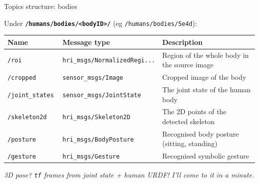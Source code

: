 \documentclass[xcolor=table]{beamer}
\begin{document}
\begin{frame}{Topics structure: bodies}

    Under \textbf{\texttt{/humans/bodies/<bodyID>/}} (eg \texttt{/humans/bodies/5e4d}):

    \scriptsize
    \begin{tabular}{@{}llp{4cm}@{}}
        \toprule
        \textbf{Name} & \textbf{Message type}         & \textbf{Description}                                                \\ \midrule
        \texttt{/roi       }   & \texttt{hri\_msgs/NormalizedRegi...} & Region of the whole body in the source image                              \\
        \texttt{/cropped       }   & \texttt{sensor\_msgs/Image} & Cropped image of the body                              \\
        \texttt{/joint\_states       }   & \texttt{sensor\_msgs/JointState} & The joint state of the human body                              \\
        \texttt{/skeleton2d}   & \texttt{hri\_msgs/Skeleton2D}        & The 2D points of the detected skeleton                              \\
        \texttt{/posture}    & \texttt{hri\_msgs/BodyPosture}      & Recognised body posture (sitting, standing)                                 \\
        \texttt{/gesture}    & \texttt{hri\_msgs/Gesture}      & Recognised symbolic gesture                                 \\
        \bottomrule               
\end{tabular}

    \vspace{1em}
    \emph{3D pose? \texttt{tf} frames from joint state + human URDF! I'll come to it
    in a minute.}
    
\end{frame}
\end{document}

